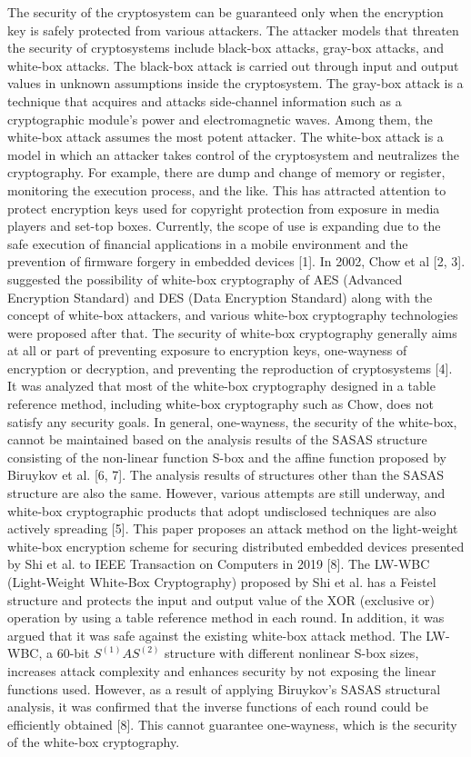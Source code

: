 \documentclass{ieeeaccess}
\begin{document}
The security of the cryptosystem can be guaranteed only when the encryption key is safely protected from various attackers. The attacker models that threaten the security of cryptosystems include black-box attacks, gray-box attacks, and white-box attacks. The black-box attack is carried out through input and output values in unknown assumptions inside the cryptosystem. The gray-box attack is a technique that acquires and attacks side-channel information such as a cryptographic module's power and electromagnetic waves. Among them, the white-box attack assumes the most potent attacker. The white-box attack is a model in which an attacker takes control of the cryptosystem and neutralizes the cryptography. For example, there are dump and change of memory or register, monitoring the execution process, and the like. This has attracted attention to protect encryption keys used for copyright protection from exposure in media players and set-top boxes. Currently, the scope of use is expanding due to the safe execution of financial applications in a mobile environment and the prevention of firmware forgery in embedded devices [1]. In 2002, Chow et al [2, 3]. suggested the possibility of white-box cryptography of AES (Advanced Encryption Standard) and DES (Data Encryption Standard) along with the concept of white-box attackers, and various white-box cryptography technologies were proposed after that. The security of white-box cryptography generally aims at all or part of preventing exposure to encryption keys, one-wayness of encryption or decryption, and preventing the reproduction of cryptosystems [4]. It was analyzed that most of the white-box cryptography designed in a table reference method, including white-box cryptography such as Chow, does not satisfy any security goals. In general, one-wayness, the security of the white-box, cannot be maintained based on the analysis results of the SASAS structure consisting of the non-linear function S-box and the affine function proposed by Biruykov et al. [6, 7]. The analysis results of structures other than the SASAS structure are also the same. However, various attempts are still underway, and white-box cryptographic products that adopt undisclosed techniques are also actively spreading [5].
This paper proposes an attack method on the light-weight white-box encryption scheme for securing distributed embedded devices presented by Shi et al. to IEEE Transaction on Computers in 2019 [8]. The LW-WBC (Light-Weight White-Box Cryptography) proposed by Shi et al. has a Feistel structure and protects the input and output value of the XOR (exclusive or) operation by using a table reference method in each round. In addition, it was argued that it was safe against the existing white-box attack method. The LW-WBC, a 60-bit $S^{(1)} AS^{(2)}$ structure with different nonlinear S-box sizes, increases attack complexity and enhances security by not exposing the linear functions used. However, as a result of applying Biruykov's SASAS structural analysis, it was confirmed that the inverse functions of each round could be efficiently obtained [8]. This cannot guarantee one-wayness, which is the security of the white-box cryptography. 
\end{document}
